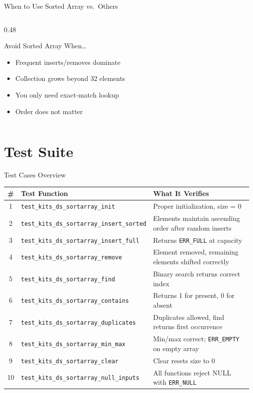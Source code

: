 \documentclass[aspectratio=169, 10pt]{beamer}
\begin{document}
\begin{frame}{When to Use Sorted Array vs.\ Others}
\begin{columns}[T]
\begin{column}{0.48\textwidth}
\begin{block}{Avoid Sorted Array When\ldots}
\begin{itemize}
  \item Frequent inserts/removes dominate
  \item Collection grows beyond 32 elements
  \item You only need exact-match lookup
  \item Order does not matter
\end{itemize}
\end{block}
\end{column}
\end{columns}
\end{frame}

\section{Test Suite}

\begin{frame}{Test Cases Overview}
\begin{table}
\centering
\small
\begin{tabular}{@{}clp{7cm}@{}}
\toprule
\textbf{\#} & \textbf{Test Function} & \textbf{What It Verifies} \\
\midrule
1 & \texttt{test\_kits\_ds\_sortarray\_init}
  & Proper initialization, size = 0 \\
2 & \texttt{test\_kits\_ds\_sortarray\_insert\_sorted}
  & Elements maintain ascending order after random inserts \\
3 & \texttt{test\_kits\_ds\_sortarray\_insert\_full}
  & Returns \texttt{ERR\_FULL} at capacity \\
4 & \texttt{test\_kits\_ds\_sortarray\_remove}
  & Element removed, remaining elements shifted correctly \\
5 & \texttt{test\_kits\_ds\_sortarray\_find}
  & Binary search returns correct index \\
6 & \texttt{test\_kits\_ds\_sortarray\_contains}
  & Returns 1 for present, 0 for absent \\
7 & \texttt{test\_kits\_ds\_sortarray\_duplicates}
  & Duplicates allowed, find returns first occurrence \\
8 & \texttt{test\_kits\_ds\_sortarray\_min\_max}
  & Min/max correct; \texttt{ERR\_EMPTY} on empty array \\
9 & \texttt{test\_kits\_ds\_sortarray\_clear}
  & Clear resets size to 0 \\
10 & \texttt{test\_kits\_ds\_sortarray\_null\_inputs}
  & All functions reject NULL with \texttt{ERR\_NULL} \\
\bottomrule
\end{tabular}
\end{table}
\end{frame}
\end{document}
